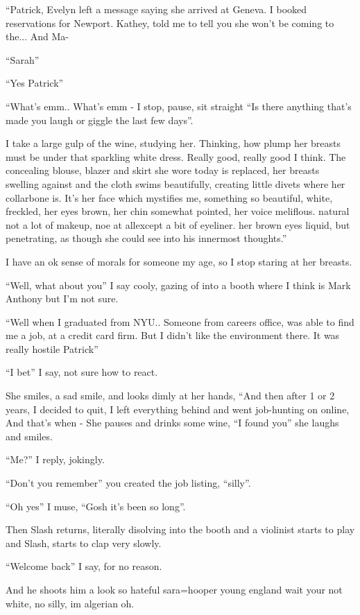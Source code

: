 \documentclass[19pt,openany]{book}
\begin{document}
``Patrick, Evelyn left a message saying she arrived at Geneva. I booked
reservations for Newport. Kathey, told me to tell you she won't be coming to the...
And Ma-

``Sarah''

``Yes Patrick''

``What's emm.. What's emm - I stop, pause, sit straight
``Is there anything that's made you laugh or giggle the last
few days''.

I take a large gulp of the wine, studying her. Thinking, how plump her breasts
must be under that sparkling white dress. Really good, really good I think.
The concealing blouse, blazer and skirt she wore today is replaced,
her breasts swelling against and the cloth swims beautifully, creating little divets
where her collarbone is. It's her face which mystifies me, something so beautiful, white,
freckled, her eyes brown, her chin somewhat pointed, her voice meliflous. natural not a lot of makeup, noe
at allexcept a bit of eyeliner.
her brown eyes liquid, but penetrating, as though she could see into his innermost thoughts.”

I have an ok sense of morals for someone my age, so I stop staring at her breasts.

``Well, what about you'' I say cooly, gazing of into a booth where I think is Mark Anthony but
I'm not sure.

``Well when I graduated from NYU.. Someone from careers office, was able to find me a job, at
a credit card firm. But I didn't like the environment there. It was really hostile Patrick''

``I bet'' I say, not sure how to react.

She smiles, a sad smile, and looks dimly at her hands, ``And then after 1 or 2 years, I decided
to quit, I left everything behind and went job-hunting on online, And that's when - She pauses
and drinks some wine, ``I found you'' she laughs and smiles.

``Me?'' I reply, jokingly.

``Don't you remember'' you created the job listing, ``silly''.

``Oh yes'' I muse, ``Gosh it's been so long''.

Then Slash returns, literally disolving into the booth and a violinist starts to play
and Slash, starts to clap very slowly.

``Welcome back'' I say, for no reason.

And he shoots him a look so hateful
sara=hooper young england
wait your not white, no silly, im algerian oh.
\end{document}
